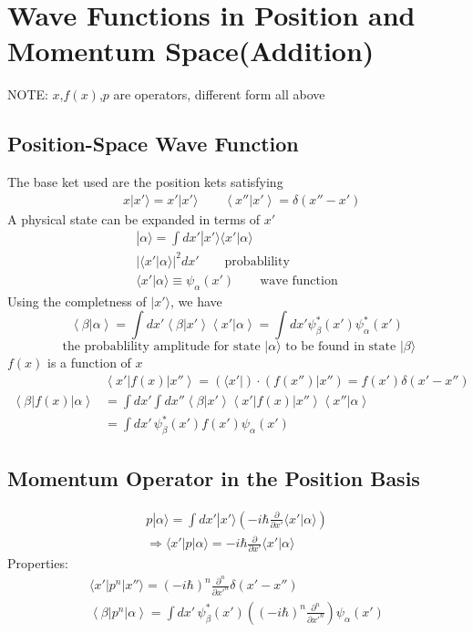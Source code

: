 \section{Wave Functions in Position and Momentum Space(Addition)}
NOTE: \(x\),\(f(x)\),\(p\) are operators, different form all above
\subsection{Position-Space Wave Function}
The base ket used are the position kets satisfying
\[\begin{aligned}
	& x|x'\rangle = x'|x'\rangle \qquad
	\left\langle x''|x' \right\rangle = \delta(x''-x')
\end{aligned}\]
A physical state can be expanded in terms of \(x'\)
\[\begin{aligned}
	|\alpha\rangle=\int dx' |x'\rangle\langle x'|\alpha\rangle \\
	|\langle x'|\alpha\rangle|^2dx' \qquad\text{probablility} \\
	\langle x'|\alpha\rangle \equiv \psi_\alpha(x') \qquad\text{wave function}
\end{aligned}\]
Using the completness of \(|x'\rangle\), we have\[                                                                      
\left\langle \beta|\alpha \right\rangle = \int dx'\left\langle \beta|x'\right\rangle\left\langle x'|\alpha\right\rangle  
= \int dx'\psi^*_\beta(x')\psi^*_\alpha(x')  \] 
\[\text{ the probablility amplitude for state } |\alpha\rangle \text{ to be found in state }|\beta\rangle\]
\(f(x)\) is a function of \(x\)
\[\begin{aligned}
	&\left\langle x'|f(x)|x''\right\rangle = (\langle x'|)\cdot(f(x'')|x'') = f(x')\delta(x'-x'')\\ 
	\left\langle \beta|f(x)|\alpha\right\rangle &=\int dx'\int dx'' \left\langle \beta|x'\right\rangle \left\langle x'|f(x)|x''\right\rangle \left\langle x''|\alpha\right\rangle \\
	&= \int dx'\,\psi_\beta^*(x')f(x')\psi_\alpha(x')
\end{aligned}\]
\subsection{Momentum Operator in the Position Basis}
\[\begin{aligned}
	p|\alpha\rangle = \int dx'|x'\rangle\left(-i\hbar\frac{\partial}{\partial x'}\langle x'|\alpha \rangle\right) \\
	\Rightarrow \langle x'|p|\alpha\rangle = -i\hbar\frac{\partial}{\partial x'}\langle x'|\alpha \rangle
\end{aligned}\]
Properties:
\[\begin{aligned}
	\langle x'|p^n|x''\rangle = (-i\hbar)^n\frac{\partial^n}{\partial x'^n}\delta(x'-x'')   \\
	\left\langle \beta|p^n |\alpha\right\rangle = \int dx'\,\psi_\beta^*(x')\left((-i\hbar)^n\frac{\partial^n}{\partial x'^n}\right) \psi_\alpha(x')
\end{aligned}\]

